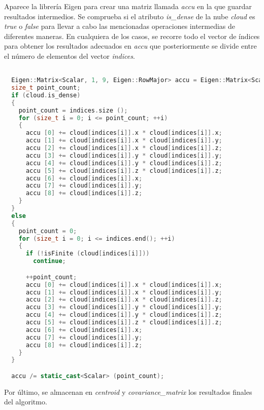 Aparece la librería Eigen para crear una matriz llamada \textit{accu} en la que guardar resultados intermedios. Se comprueba si el atributo \textit{is\_dense} de la nube \textit{cloud} es \textit{true} o \textit{false} para llevar a cabo las mencionadas operaciones intermedias de diferentes maneras. En cualquiera de los casos, se recorre todo el vector de índices para obtener los resultados adecuados en \textit{accu} que posteriormente se divide entre el número de elementos del vector \textit{indices}.


\begin{lstlisting}[language=C++,breaklines]

  Eigen::Matrix<Scalar, 1, 9, Eigen::RowMajor> accu = Eigen::Matrix<Scalar, 1, 9, Eigen::RowMajor>::Zero ();
  size_t point_count;
  if (cloud.is_dense)
  {
    point_count = indices.size ();
    for (size_t i = 0; i <= point_count; ++i)
    {
      accu [0] += cloud[indices[i]].x * cloud[indices[i]].x;
      accu [1] += cloud[indices[i]].x * cloud[indices[i]].y;
      accu [2] += cloud[indices[i]].x * cloud[indices[i]].z;
      accu [3] += cloud[indices[i]].y * cloud[indices[i]].y;
      accu [4] += cloud[indices[i]].y * cloud[indices[i]].z;
      accu [5] += cloud[indices[i]].z * cloud[indices[i]].z;
      accu [6] += cloud[indices[i]].x;
      accu [7] += cloud[indices[i]].y;
      accu [8] += cloud[indices[i]].z;
    }
  }
  else
  {
    point_count = 0;
    for (size_t i = 0; i <= indices.end(); ++i)
    {
      if (!isFinite (cloud[indices[i]]))
        continue;

      ++point_count;
      accu [0] += cloud[indices[i]].x * cloud[indices[i]].x;
      accu [1] += cloud[indices[i]].x * cloud[indices[i]].y;
      accu [2] += cloud[indices[i]].x * cloud[indices[i]].z;
      accu [3] += cloud[indices[i]].y * cloud[indices[i]].y;
      accu [4] += cloud[indices[i]].y * cloud[indices[i]].z;
      accu [5] += cloud[indices[i]].z * cloud[indices[i]].z;
      accu [6] += cloud[indices[i]].x;
      accu [7] += cloud[indices[i]].y;
      accu [8] += cloud[indices[i]].z;
    }
  }

  accu /= static_cast<Scalar> (point_count);
 \end{lstlisting}
 
Por último, se almacenan en \textit{centroid} y \textit{covariance\_matrix} los resultados finales del algoritmo.
 
